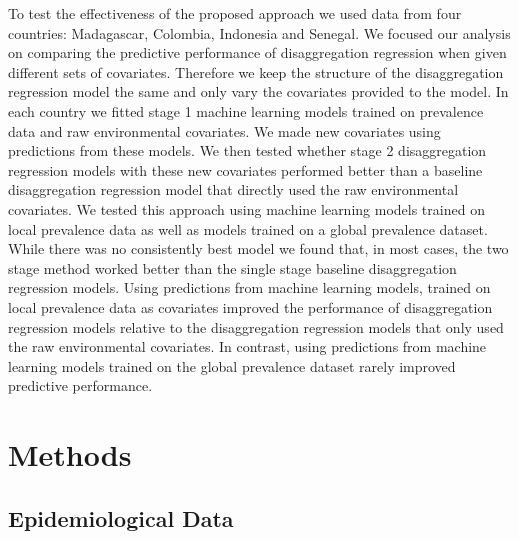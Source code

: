 \documentclass[review]{elsarticle}
\begin{document}
To test the effectiveness of the proposed approach we used data from four countries: Madagascar, Colombia, Indonesia and Senegal.
We focused our analysis on comparing the predictive performance of disaggregation regression when given different sets of covariates.
Therefore we keep the structure of the disaggregation regression model the same and only vary the covariates provided to the model.
In each country we fitted stage 1 machine learning models trained on prevalence data and raw environmental covariates.
We made new covariates using predictions from these models.
We then tested whether stage 2 disaggregation regression models with these new covariates performed better than a baseline disaggregation regression model that directly used the raw environmental covariates.
We tested this approach using machine learning models trained on local prevalence data as well as models trained on a global prevalence dataset.
While there was no consistently best model we found that, in most cases, the two stage method worked better than the single stage baseline disaggregation regression models.
Using predictions from machine learning models, trained on local prevalence data as covariates improved the performance of disaggregation regression models relative to the disaggregation regression models that only used the raw environmental covariates.
In contrast, using predictions from machine learning models trained on the global prevalence dataset rarely improved predictive performance.

\section{Methods}

\subsection{Epidemiological Data}
\end{document}
